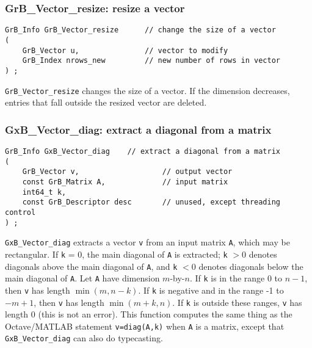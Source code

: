 \documentclass[12pt]{article}
\begin{document}
{%
\subsubsection{{\sf GrB\_Vector\_resize:}          resize a vector}
\label{vector_resize}

\begin{mdframed}[userdefinedwidth=6in]
{\footnotesize
\begin{verbatim}
GrB_Info GrB_Vector_resize      // change the size of a vector
(
    GrB_Vector u,               // vector to modify
    GrB_Index nrows_new         // new number of rows in vector
) ;
\end{verbatim} } \end{mdframed}

\verb'GrB_Vector_resize' changes the size of a vector.  If the dimension
decreases, entries that fall outside the resized vector are deleted.

\newpage
\subsubsection{{\sf GxB\_Vector\_diag:} extract a diagonal from a matrix}
\label{vector_diag}

\begin{mdframed}[userdefinedwidth=6in]
{\footnotesize
\begin{verbatim}
GrB_Info GxB_Vector_diag    // extract a diagonal from a matrix
(
    GrB_Vector v,                   // output vector
    const GrB_Matrix A,             // input matrix
    int64_t k,
    const GrB_Descriptor desc       // unused, except threading control
) ;
\end{verbatim} } \end{mdframed}


\verb'GxB_Vector_diag' extracts a vector \verb'v' from an input matrix
\verb'A', which may be rectangular.  If \verb'k' = 0, the main diagonal of
\verb'A' is extracted; \verb'k' $> 0$ denotes diagonals above the main diagonal
of \verb'A', and \verb'k' $< 0$ denotes diagonals below the main diagonal of
\verb'A'.  Let \verb'A' have dimension $m$-by-$n$.  If \verb'k' is in the range
0 to $n-1$, then \verb'v' has length $\min(m,n-k)$.  If \verb'k' is negative
and in the range -1 to $-m+1$, then \verb'v' has length $\min(m+k,n)$.  If
\verb'k' is outside these ranges, \verb'v' has length 0 (this is not an error).
This function computes the same thing as the Octave/MATLAB statement
\verb'v=diag(A,k)' when \verb'A' is a matrix, except that
\verb'GxB_Vector_diag' can also do typecasting.

}
\end{document}
